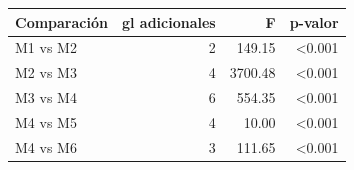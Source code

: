\begin{tabular}{lrrr}
\toprule
Comparación & gl adicionales & F & p-valor \\
\midrule
M1 vs M2 & 2 & 149.15 & <0.001 \\
M2 vs M3 & 4 & 3700.48 & <0.001 \\
M3 vs M4 & 6 & 554.35 & <0.001 \\
M4 vs M5 & 4 & 10.00 & <0.001 \\
M4 vs M6 & 3 & 111.65 & <0.001 \\
\bottomrule
\end{tabular}
